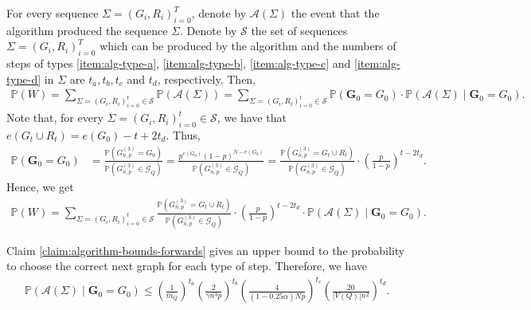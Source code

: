 \documentclass[11pt,a4paper,oneside,reqno]{amsart}
\newcommand{\Gnp}{G_{n, p}^{(3)}}
\newcommand{\bG}{\mathbf{G}}
\newcommand{\cA}{\mathcal{A}}
\newcommand{\cG}{\mathcal{G}}
\newcommand{\cS}{\mathcal{S}}
\renewcommand{\Pr}{\mathbb{P}}
\newcommand{\1}{\mathbbm{1}} %
\renewcommand{\le}{\leqslant}
\begin{document}
For every sequence $\Sigma = (G_i, R_i)_{i=0}^{T}$, denote by $\cA(\Sigma)$ the event that the algorithm produced the sequence $\Sigma$. Denote by $\cS$ the set of sequences $\Sigma = (G_i, R_i)_{i=0}^{T}$ which can be produced by the algorithm and the numbers of steps of types \ref{item:alg-type-a}, \ref{item:alg-type-b}, \ref{item:alg-type-c} and \ref{item:alg-type-d} in $\Sigma$ are $t_a, t_b, t_c$ and $t_d$, respectively. Then,
\begin{align*}
    \Pr(W) = \sum_{\Sigma = (G_i, R_i)_{i=0}^{t}\in \cS} \Pr(\cA(\Sigma)) = \sum_{\Sigma = (G_i, R_i)_{i=0}^{t}\in \cS} \Pr(\bG_0 = G_0) \cdot \Pr(\cA(\Sigma) \mid \bG_0 = G_0).
\end{align*}
Note that, for every $\Sigma = (G_i, R_i)_{i=0}^{t} \in \cS$, we have that $e(G_t \cup R_t) = e(G_0) - t + 2t_d$. Thus,
\begin{align*}
    \Pr(\bG_0 = G_0) &= \frac{\Pr\left(\Gnp = G_0\right)}{\Pr\left(\Gnp \in \cG_Q\right)} = \frac{p^{e(G_0)} (1-p)^{N-e(G_0)}}{\Pr\left(\Gnp \in \cG_Q\right)} 
    = \frac{\Pr\left(\Gnp = G_t \cup R_t\right)}{\Pr\left(\Gnp \in \cG_Q\right)} \cdot \left(\frac{p}{1-p}\right)^{t - 2t_d}.
\end{align*}
Hence, we get
\begin{align}\label{align:W-probability}
    \Pr(W) = \sum_{\Sigma = (G_i, R_i)_{i=0}^{t}\in \cS} \frac{\Pr\left(\Gnp = G_t \cup R_t\right)}{\Pr\left(\Gnp \in \cG_Q\right)} \cdot \left(\frac{p}{1-p}\right)^{t - 2t_d} \cdot \Pr(\cA(\Sigma) \mid \bG_0 = G_0).
\end{align}

Claim \ref{claim:algorithm-bounds-forwards} gives an upper bound to the probability to choose the correct next graph for each type of step. Therefore, we have
\begin{align}\label{align:algorithm-probability-bound}
    \Pr(\cA(\Sigma) \mid \bG_0 = G_0) \le \left(\frac{1}{m_Q}\right)^{t_a} \left(\frac{2}{\gamma n^3 p}\right)^{t_b} \left(\frac{4}{(1-0.25\alpha) N p}\right)^{t_c} \left(\frac{20}{|V(Q)| n^2}\right)^{t_d}.
\end{align}
\end{document}

